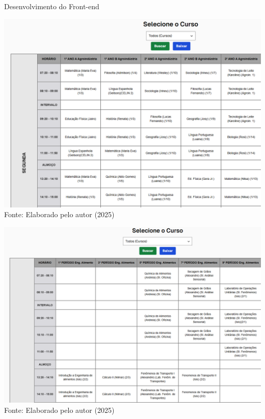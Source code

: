 \begin{frame}{Desenvolvimento do Front-end}
    \begin{minipage}{0.48\textwidth}
        \centering
        \includegraphics[width=1\textwidth]{figuras/front-3.png}
        \small Fonte: Elaborado pelo autor (2025)
    \end{minipage}
    \hfill
    \begin{minipage}{0.48\textwidth}
        \centering
        \includegraphics[width=1\textwidth]{figuras/front-4.png}
        \small Fonte: Elaborado pelo autor (2025)
    \end{minipage}
\end{frame}


